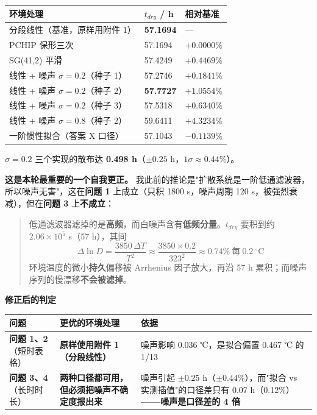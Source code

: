 \begin{center}
\small
\begin{tabular}{lll}
\toprule
环境处理 & $t_{dry}$ / h & 相对基准 \\
\midrule
分段线性（基准，原样用附件 1） & \textbf{57.1694} & — \\
PCHIP 保形三次 & 57.1694 & $+0.0000\%$ \\
SG(41,2) 平滑 & 57.4249 & $+0.4469\%$ \\
线性 + 噪声 $\sigma=0.2$（种子 1） & 57.2746 & $+0.1841\%$ \\
线性 + 噪声 $\sigma=0.2$（种子 2） & \textbf{57.7727} & $+1.0554\%$ \\
线性 + 噪声 $\sigma=0.2$（种子 3） & 57.5318 & $+0.6340\%$ \\
线性 + 噪声 $\sigma=0.8$（种子 2） & 59.6411 & $+4.3234\%$ \\
一阶惯性拟合（答案 X 口径） & 57.1043 & $-0.1139\%$ \\
\bottomrule
\end{tabular}
\end{center}


$\sigma=0.2$ 三个实现的散布达 \textbf{0.498 h}（$\pm0.25$ h，$1\sigma\approx0.44\%$）。


\textbf{这是本轮最重要的一个自我更正。} 我此前的推论是"扩散系统是一阶低通滤波器，所以噪声无害"，这在\textbf{问题 1} 上成立（只积 1800 s，噪声周期 120 s，被强烈衰减），但在\textbf{问题 3} 上\textbf{不成立}：


\begin{quote}
低通滤波器滤掉的是\textbf{高频}，而白噪声含有\textbf{低频分量}。$t_{dry}$ 要积到约 $2.06\times10^5$ s（57 h），其间 $$\Delta\ln D=\frac{3850\,\Delta T}{T^2}\approx\frac{3850\times0.2}{323^2}\approx0.74\%\ \text{每}\ 0.2\ \mathrm{^\circ C}$$ 环境温度的微小\textbf{持久}偏移被 Arrhenius 因子放大，再沿 57 h 累积；而噪声序列的慢漂移\textbf{不会被滤掉}。
\end{quote}


\textbf{修正后的判定}


\begin{center}
\small
\begin{tabular}{lll}
\toprule
问题 & 更优的环境处理 & 依据 \\
\midrule
\textbf{问题 1、2}（短时表格） & \textbf{原样使用附件 1（分段线性）} & 噪声影响 0.036 ℃，是拟合偏置 0.467 ℃ 的 1/13 \\
\textbf{问题 3、4}（长时时长） & \textbf{两种口径都可用，但必须把噪声不确定度报出来} & 噪声引起 $\pm0.25$ h（$\pm0.44\%$），而"拟合 vs 实测插值"的口径差只有 0.07 h（0.12\%）\textbf{——噪声是口径差的 4 倍} \\
\bottomrule
\end{tabular}
\end{center}


